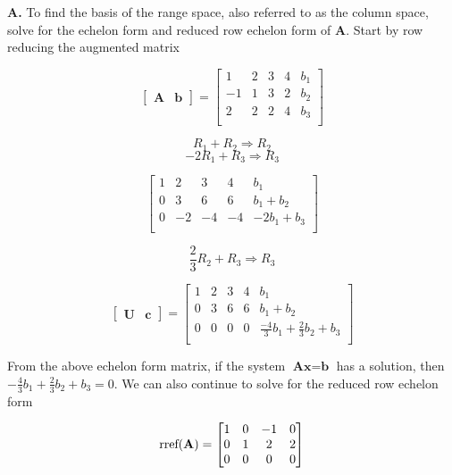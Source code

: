 \documentclass[main.tex]{subfiles}
\begin{document}
\begin{enumerate}
\begin{enumerate}
        \textbf{A.} To find the basis of the range space, also referred to as the column space, solve for the echelon form and reduced row echelon form of \textbf{A}. Start by row reducing the augmented matrix
        
        $$ 
        \left[\begin{array}{ll}\textbf{A} & \textbf{b} \end{array}\right]  = \begin{bmatrix} 
    	1 & 2 & 3 & 4 & b_1\\
    	-1 & 1 & 3 & 2 & b_2\\
    	2 & 2 & 2 & 4 & b_3\\
        \end{bmatrix}
        $$
        
        $$R_1 + R_2 \Rightarrow R_2$$  
        $$-2R_1 + R_3 \Rightarrow R_3$$
         
        $$
        \begin{bmatrix} 
    	1 & 2 & 3 & 4 & b_1\\
    	0 & 3 & 6 & 6 & b_1 + b_2 \\
    	0 & -2 & -4 & -4 & -2b_1 + b_3 \\
        \end{bmatrix}
        $$
        
        $$\frac{2}{3}R_2 + R_3 \Rightarrow R_3$$
        
        $$
        \left[\begin{array}{ll} \textbf{U} & \textbf{c} \end{array}\right] =
        \begin{bmatrix} 
    	1 & 2 & 3 & 4 & b_1\\
    	0 & 3 & 6 & 6 & b_1 + b_2 \\
    	0 & 0 & 0 & 0 & \frac{-4}{3}b_1 + \frac{2}{3}b_2 + b_3 \\
        \end{bmatrix}
        $$
        
        From the above echelon form matrix, if the system $\textbf{A} \textbf{x}=\textbf{b}$ has a solution, then $-\frac{4}{3}b_1 + \frac{2}{3}b_2 + b_3 = 0$. We can also continue to solve for the reduced row echelon form
        
        $$
        \text{rref(\textbf{A})} = \begin{bmatrix} 
    	1 & 0 & -1 & 0 \\
    	0 & 1 & 2 & 2 \\
    	0 & 0 & 0 & 0 \\
        \end{bmatrix}
        $$
        

\end{enumerate}
\end{enumerate}
\end{document}
